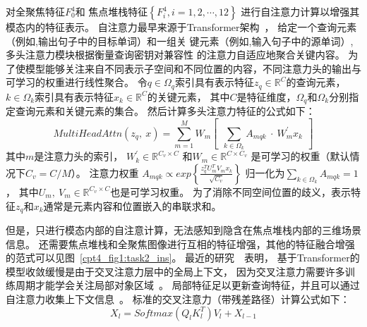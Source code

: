 对全聚焦特征$ F_{0}^{4} $和
焦点堆栈特征$ \left \{ F_{i}^{4}, i=1,2, \cdots, 12 \right \}$
进行自注意力计算以增强其模态内的特征表示。
自注意力最早来源于Transformer架构~\cite{vaswani2017attention}，
给定一个查询元素（例如,输出句子中的目标单词）和一组关
键元素（例如,输入句子中的源单词）,多头注意力模块根据衡量查询密钥对兼容性
的注意力自适应地聚合关键内容。
为了使模型能够关注来自不同表示子空间和不同位置的内容，不同注意力头的输出与可学习的权重进行线性聚合。
%
%
%
%
%
%
%
%
%
令$q\in \Omega_{q}$索引具有表示特征$z_{q} \in \mathbb{R}^{C}$的查询元素，
$k\in \Omega_{k}$索引具有表示特征$x_{k} \in \mathbb{R}^{C}$的关键元素，
其中$C$是特征维度，$\Omega_{q}$和$\Omega_{k}$分别指定查询元素和关键元素的集合。
然后计算多头注意力特征的公式如下：
% 
% 
% 
% 
\begin{equation}
	MultiHeadAttn(z_{q},~x)=\sum_{m=1}^{M}
	W_{m}\left [ ~~\sum_{k\in \Omega_{k}}^{}A_{mqk} ~\cdot~ W_{m}^{'} x_{k}  ~~\right ]  
\end{equation}
% 
% 
% 
% 
其中$m$是注意力头的索引，
$ W_{k}^{{}' } \in \mathbb{R}^{C_{v} \times C} $
和$W_{m} \in \mathbb{R}^{C\times C_{v} }$
是可学习的权重（默认情况下$C_{v}=C/M$）。
注意力权重 
$A_{mqk} \propto exp \left \{ 
\frac{
	z_{q}^{T} U_{m}^{T} V_{m} x_{k}
}{ \sqrt{C_{v}}
}  \right \} $
% 
% 
% 
归一化为$ {\textstyle \sum_{k\in\Omega_{k}}^{}} A_{mqk} = 1$，
其中$U_{m},~V_{m} \in \mathbb{R}^{C_{v}\times C}$也是可学习权重。
为了消除不同空间位置的歧义，表示特征$z_{q}$和$x_{k}$通常是元素内容和位置嵌入的串联求和。
%
%
%
%
%
%
\par
%
%
%
%
但是，只进行模态内部的自注意计算，无法感知到隐含在焦点堆栈内部的三维场景信息。
还需要焦点堆栈和全聚焦图像进行互相的特征增强，其他的特征融合增强的范式可以见图~\ref{cpt4_fig1:task2_ins}。
最近的研究~\cite{gao2021fast,sun2021rethinking}~表明，
基于Transformer的模型收敛缓慢是由于交叉注意力层中的全局上下文，
因为交叉注意力需要许多训练周期才能学会关注局部对象区域~\cite{sun2021rethinking}。
局部特征足以更新查询特征，并且可以通过自注意力收集上下文信息~\cite{cheng2022masked}。
标准的交叉注意力（带残差路径）计算公式如下：
\begin{equation}
	X_{l}=Softmax(Q_{l}K_{l}^{T})V_{l} + X_{l-1}
\end{equation}
